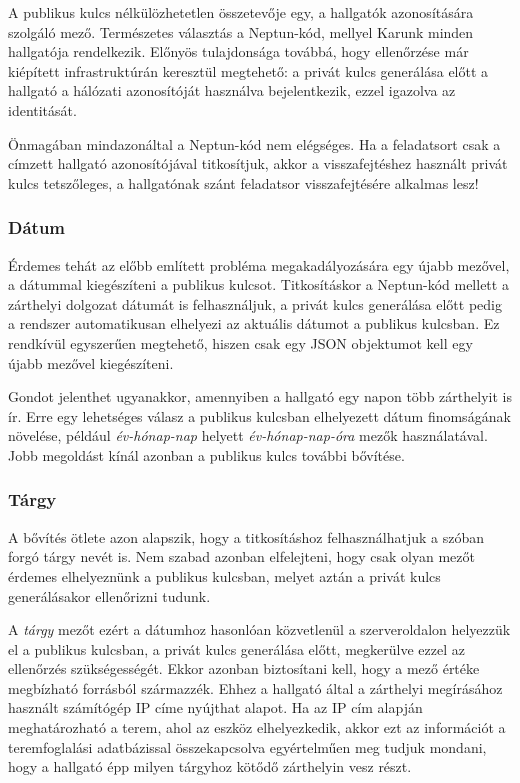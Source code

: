 A publikus kulcs nélkülözhetetlen összetevője egy, a hallgatók azonosítására szolgáló mező. Természetes választás a Neptun-kód, mellyel Karunk minden hallgatója rendelkezik. Előnyös tulajdonsága továbbá, hogy ellenőrzése már kiépített infrastruktúrán keresztül megtehető: a privát kulcs generálása előtt a hallgató a hálózati azonosítóját használva bejelentkezik, ezzel igazolva az identitását.

Önmagában mindazonáltal a Neptun-kód nem elégséges. Ha a feladatsort csak a címzett hallgató azonosítójával titkosítjuk, akkor a visszafejtéshez használt privát kulcs tetszőleges, a hallgatónak szánt feladatsor visszafejtésére alkalmas lesz!

\subsubsection{Dátum}

Érdemes tehát az előbb említett probléma megakadályozására egy újabb mezővel, a dátummal kiegészíteni a publikus kulcsot. Titkosításkor a Neptun-kód mellett a zárthelyi dolgozat dátumát is felhasználjuk, a privát kulcs generálása előtt pedig a rendszer automatikusan elhelyezi az aktuális dátumot a publikus kulcsban. Ez rendkívül egyszerűen megtehető, hiszen csak egy JSON objektumot kell egy újabb mezővel kiegészíteni.

Gondot jelenthet ugyanakkor, amennyiben a hallgató egy napon több zárthelyit is ír. Erre egy lehetséges válasz a publikus kulcsban elhelyezett dátum finomságának növelése, például \textit{év-hónap-nap} helyett \textit{év-hónap-nap-óra} mezők használatával. Jobb megoldást kínál azonban a publikus kulcs további bővítése.

\subsubsection{Tárgy}

A bővítés ötlete azon alapszik, hogy a titkosításhoz felhasználhatjuk a szóban forgó tárgy nevét is. Nem szabad azonban elfelejteni, hogy csak olyan mezőt érdemes elhelyeznünk a publikus kulcsban, melyet aztán a privát kulcs generálásakor ellenőrizni tudunk.

A \textit{tárgy} mezőt ezért a dátumhoz hasonlóan közvetlenül a szerveroldalon helyezzük el a publikus kulcsban, a privát kulcs generálása előtt, megkerülve ezzel az ellenőrzés szükségességét. Ekkor azonban biztosítani kell, hogy a mező értéke megbízható forrásból származzék. Ehhez a hallgató által a zárthelyi megírásához használt számítógép IP címe nyújthat alapot. Ha az IP cím alapján meghatározható a terem, ahol az eszköz elhelyezkedik, akkor ezt az információt a teremfoglalási adatbázissal összekapcsolva egyértelműen meg tudjuk mondani, hogy a hallgató épp milyen tárgyhoz kötődő zárthelyin vesz részt.

